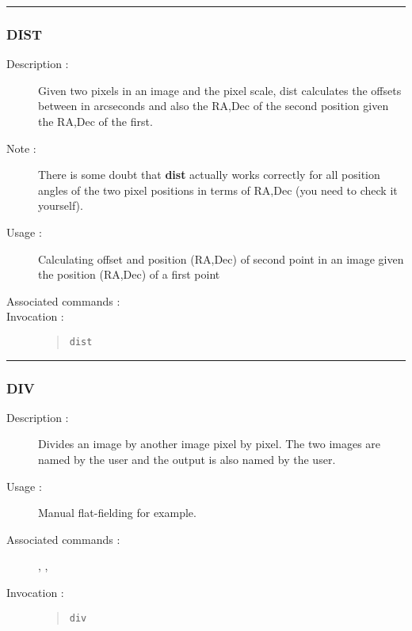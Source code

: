 \hrule
\subsubsection*{\label{DIST}DIST}

\begin{description}

\item[Description :] Given two pixels in an image and the pixel scale,
dist calculates the offsets between in arcseconds and also the RA,Dec
of the second position given the RA,Dec of the first.

\item[Note :] There is some doubt that {\bf dist} actually works correctly
for all position angles of the two pixel positions in terms of RA,Dec
(you need to check it yourself).

\item[Usage :] Calculating offset and position (RA,Dec) of second point in
an image given the position (RA,Dec) of a first point
\item[Associated commands :] {\tt {}}
\item[Invocation :]

\begin{quote}{\tt  dist }\end{quote}

\end{description}

\hrule
\subsubsection*{\label{DIV}DIV}

\begin{description}

\item[Description :] Divides an image by another image pixel by pixel.
The two images are named by the user and the output is also named by
the user.

\item[Usage :] Manual flat-fielding for example.

\item[Associated commands :] {\tt {}},
{\tt {}}, {\tt {}}

\item[Invocation :]

\begin{quote}{\tt  div }\end{quote}

\end{description}

